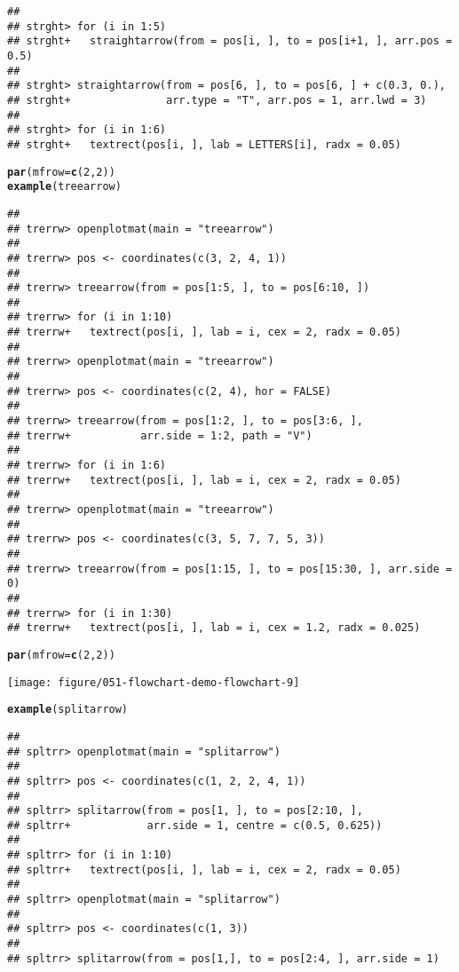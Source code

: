 \documentclass{article}\usepackage[]{graphicx}\usepackage[]{color}
\makeatletter
\def\maxwidth{ %
  \ifdim\Gin@nat@width>\linewidth
    \linewidth
  \else
    \Gin@nat@width
  \fi
}
\newcommand{\hlnum}[1]{\textcolor[rgb]{0.686,0.059,0.569}{#1}}%
\newcommand{\hlstd}[1]{\textcolor[rgb]{0.345,0.345,0.345}{#1}}%
\newcommand{\hlkwc}[1]{\textcolor[rgb]{0.333,0.667,0.333}{#1}}%
\newcommand{\hlkwd}[1]{\textcolor[rgb]{0.737,0.353,0.396}{\textbf{#1}}}%
\newenvironment{kframe}{%
 \def\at@end@of@kframe{}%
 \ifinner\ifhmode%
  \def\at@end@of@kframe{\end{minipage}}%
  \begin{minipage}{\columnwidth}%
 \fi\fi%
 \def\FrameCommand##1{\hskip\@totalleftmargin \hskip-\fboxsep
 \colorbox{shadecolor}{##1}\hskip-\fboxsep
     \hskip-\linewidth \hskip-\@totalleftmargin \hskip\columnwidth}%
 \MakeFramed {\advance\hsize-\width
   \@totalleftmargin\z@ \linewidth\hsize
   \@setminipage}}%
 {\par\unskip\endMakeFramed%
 \at@end@of@kframe}
\newenvironment{knitrout}{}{} %
\makeatother
\begin{document}
\begin{knitrout}
\begin{kframe}
\begin{verbatim}
## 
## strght> for (i in 1:5) 
## strght+   straightarrow(from = pos[i, ], to = pos[i+1, ], arr.pos = 0.5)
## 
## strght> straightarrow(from = pos[6, ], to = pos[6, ] + c(0.3, 0.), 
## strght+               arr.type = "T", arr.pos = 1, arr.lwd = 3)    
## 
## strght> for (i in 1:6) 
## strght+   textrect(pos[i, ], lab = LETTERS[i], radx = 0.05)
\end{verbatim}
\begin{alltt}
\hlkwd{par}\hlstd{(}\hlkwc{mfrow} \hlstd{=} \hlkwd{c}\hlstd{(}\hlnum{2}\hlstd{,} \hlnum{2}\hlstd{))}
\hlkwd{example}\hlstd{(treearrow)}
\end{alltt}
\begin{verbatim}
## 
## trerrw> openplotmat(main = "treearrow")
## 
## trerrw> pos <- coordinates(c(3, 2, 4, 1))
## 
## trerrw> treearrow(from = pos[1:5, ], to = pos[6:10, ])
## 
## trerrw> for (i in 1:10) 
## trerrw+   textrect(pos[i, ], lab = i, cex = 2, radx = 0.05)
## 
## trerrw> openplotmat(main = "treearrow")
## 
## trerrw> pos <- coordinates(c(2, 4), hor = FALSE)
## 
## trerrw> treearrow(from = pos[1:2, ], to = pos[3:6, ], 
## trerrw+           arr.side = 1:2, path = "V")
## 
## trerrw> for (i in 1:6) 
## trerrw+   textrect(pos[i, ], lab = i, cex = 2, radx = 0.05)
## 
## trerrw> openplotmat(main = "treearrow")
## 
## trerrw> pos <- coordinates(c(3, 5, 7, 7, 5, 3))
## 
## trerrw> treearrow(from = pos[1:15, ], to = pos[15:30, ], arr.side = 0)
## 
## trerrw> for (i in 1:30) 
## trerrw+   textrect(pos[i, ], lab = i, cex = 1.2, radx = 0.025)
\end{verbatim}
\begin{alltt}
\hlkwd{par}\hlstd{(}\hlkwc{mfrow} \hlstd{=} \hlkwd{c}\hlstd{(}\hlnum{2}\hlstd{,} \hlnum{2}\hlstd{))}
\end{alltt}
\end{kframe}
\texttt{[image: figure/051-flowchart-demo-flowchart-9]} 
\begin{kframe}\begin{alltt}
\hlkwd{example}\hlstd{(splitarrow)}
\end{alltt}
\begin{verbatim}
## 
## spltrr> openplotmat(main = "splitarrow")
## 
## spltrr> pos <- coordinates(c(1, 2, 2, 4, 1))
## 
## spltrr> splitarrow(from = pos[1, ], to = pos[2:10, ], 
## spltrr+            arr.side = 1, centre = c(0.5, 0.625))
## 
## spltrr> for (i in 1:10) 
## spltrr+   textrect(pos[i, ], lab = i, cex = 2, radx = 0.05)
## 
## spltrr> openplotmat(main = "splitarrow")
## 
## spltrr> pos <- coordinates(c(1, 3))
## 
## spltrr> splitarrow(from = pos[1,], to = pos[2:4, ], arr.side = 1)

\end{verbatim}
\end{kframe}
\end{knitrout}
\end{document}
